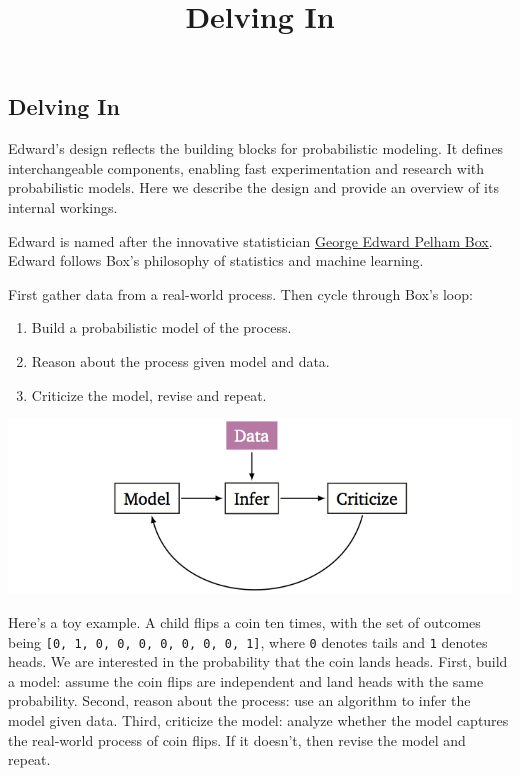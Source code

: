 \title{Delving In}

\subsection{Delving In}

Edward's design reflects the building blocks for probabilistic
modeling. It defines interchangeable components, enabling fast
experimentation and research with probabilistic models.  Here we
describe the design and provide an overview of its internal workings.

Edward is named after the innovative statistician
\href{https://en.wikipedia.org/wiki/George_E._P._Box}{George Edward
Pelham Box}. Edward follows Box's philosophy of statistics and machine
learning.

First gather data from a real-world process. Then cycle through Box's
loop:

\begin{enumerate}
\item Build a probabilistic model of the process.
\item Reason about the process given model and data.
\item Criticize the model, revise and repeat.
\end{enumerate}

\includegraphics{images/model_infer_criticize.png}

Here's a toy example. A child flips a coin ten times, with the set of
outcomes being \texttt{{[}0,\ 1,\ 0,\ 0,\ 0,\ 0,\ 0,\ 0,\ 0,\ 1{]}},
where \texttt{0} denotes tails and \texttt{1} denotes heads. We
are interested in the probability that the coin lands heads. First,
build a model: assume the coin flips are independent and land heads with
the same probability. Second, reason about the process: use an algorithm
to infer the model given data. Third, criticize the model: analyze
whether the model captures the real-world process of coin flips. If it
doesn't, then revise the model and repeat.

